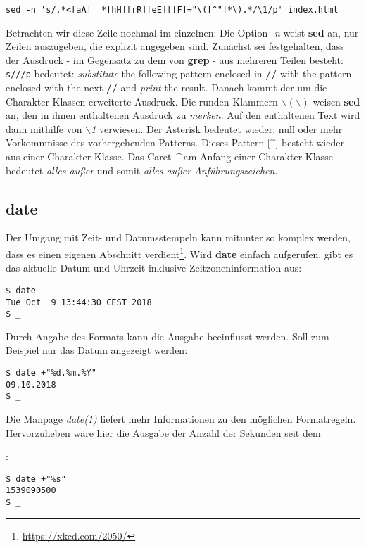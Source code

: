 \documentclass[titlepage,a4paper]{article}
\begin{document}
\begin{verbatim}
sed -n 's/.*<[aA]  *[hH][rR][eE][fF]="\([^"]*\).*/\1/p' index.html
\end{verbatim}

Betrachten wir diese Zeile nochmal im einzelnen:  Die Option \emph{-n} weist
\textbf{sed} an, nur Zeilen auszugeben, die explizit angegeben sind.  
Zunächst sei festgehalten, dass der Ausdruck - im Gegensatz zu dem von
\textbf{grep} - aus mehreren Teilen besteht: \texttt{s///p}  bedeutet:
\emph{substitute} the following pattern enclosed in \textbf{//} with the pattern
enclosed with the next \textbf{//} and \emph{print} the result.
Danach
kommt der um die Charakter Klassen erweiterte Ausdruck.  Die runden Klammern
$\backslash( \backslash)$ weisen \textbf{sed} an, den in ihnen
enthaltenen Ausdruck zu 
\emph{merken}.  Auf den enthaltenen Text wird dann mithilfe von \emph{$\backslash$1} 
verwiesen.
 Der Asterisk bedeutet wieder: null oder mehr Vorkommnisse des
vorhergehenden Patterns.  Dieses Pattern $\lbrack$\^{}\"{}$\rbrack$ besteht
wieder aus einer 
Charakter Klasse.  Das Caret \emph{\^ } am Anfang einer Charakter Klasse
bedeutet \emph{alles außer} und somit 
\emph{alles außer Anführungszeichen}.

\subsection{date}

Der Umgang mit Zeit- und Datumsstempeln kann mitunter so komplex werden,
dass es einen eigenen Abschnitt verdient\footnote{\url{https://xkcd.com/2050/}}.
Wird \textbf{date} einfach
aufgerufen, gibt es das aktuelle Datum und Uhrzeit inklusive Zeitzoneninformation aus:

\begin{verbatim}
$ date
Tue Oct  9 13:44:30 CEST 2018
$ _
\end{verbatim}

Durch Angabe des Formats kann die Ausgabe beeinflusst werden.
Soll zum Beispiel nur das Datum angezeigt werden:

\begin{verbatim}
$ date +"%d.%m.%Y"
09.10.2018
$ _
\end{verbatim}

Die Manpage \emph{date(1)} liefert mehr Informationen zu den möglichen Formatregeln.
Hervorzuheben wäre hier die Ausgabe der Anzahl der Sekunden seit dem \date{1.1.1970}:

\begin{verbatim}
$ date +"%s"
1539090500
$ _
\end{verbatim}
\end{document}
